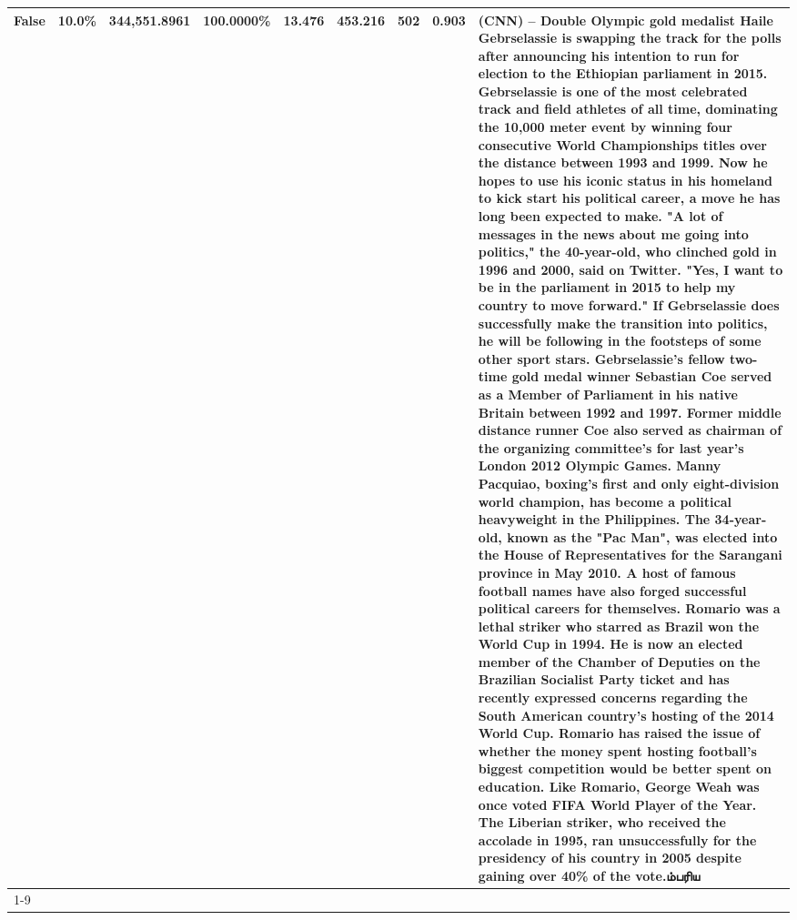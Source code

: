 \begin{table}[H]
{\begin{tabular}{lllrlllll}
False & 10.0\% & 344,551.8961 & \bfseries \color{red} 100.0000\% & 13.476 & 453.216 & 502 & 0.903 & (CNN) -- Double Olympic gold medalist Haile Gebrselassie is swapping the track for the polls after announcing his intention to run for election to the Ethiopian parliament in 2015. Gebrselassie is one of the most celebrated track and field athletes of all time, dominating the 10,000 meter event by winning four consecutive World Championships titles over the distance between 1993 and 1999. Now he hopes to use his iconic status in his homeland to kick start his political career, a move he has long been expected to make. "A lot of messages in the news about me going into politics," the 40-year-old, who clinched gold in 1996 and 2000, said on Twitter. "Yes, I want to be in the parliament in 2015 to help my country to move forward." If Gebrselassie does successfully make the transition into politics, he will be following in the footsteps of some other sport stars. Gebrselassie's fellow two-time gold medal winner Sebastian Coe served as a Member of Parliament in his native Britain between 1992 and 1997. Former middle distance runner Coe also served as chairman of the organizing committee's for last year's London 2012 Olympic Games. Manny Pacquiao, boxing's first and only eight-division world champion, has become a political heavyweight in the Philippines. The 34-year-old, known as the "Pac Man", was elected into the House of Representatives for the Sarangani province in May 2010. A host of famous football names have also forged successful political careers for themselves. Romario was a lethal striker who starred as Brazil won the World Cup in 1994. He is now an elected member of the Chamber of Deputies on the Brazilian Socialist Party ticket and has recently expressed concerns regarding the South American country's hosting of the 2014 World Cup. Romario has raised the issue of whether the money spent hosting football's biggest competition would be better spent on education. Like Romario, George Weah was once voted FIFA World Player of the Year. The Liberian striker, who received the accolade in 1995, ran unsuccessfully for the presidency of his country in 2005 despite gaining over 40\% of the vote.ம்பரிய \\
\cline{1-9}

\end{tabular}}
\end{table}
